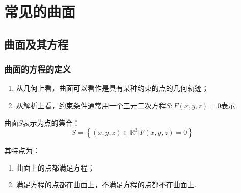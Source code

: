 \chapter{常见的曲面}
\section{曲面及其方程}
\subsection{曲面的方程的定义}
\noindent
\thispagestyle{empty}
\begin{enumerate}[]
	\setlength{\itemindent}{1em}
	\setlength{\topsep}{0.01em}
	\setlength{\itemsep}{0.01em}
	\item 从几何上看，曲面可以看作是具有{\color{dy}某种约束的点的几何轨迹}；
	\item 从解析上看，约束条件通常用一个{\color{dy}三元二次方程$S:F(x,y,z)=0$}表示.
\end{enumerate}
曲面$S$表示为点的集合：
\begin{equation}
S=\left\lbrace (x,y,z)\in \mathbb{R}^3|F(x,y,z)=0\right\rbrace 
\end{equation}
\par 其特点为：
\begin{enumerate}[(1)]
	\setlength{\itemindent}{3em}
	\setlength{\topsep}{0.01em}
	\setlength{\itemsep}{0.01em}
	\item 曲面上的点都满足方程；
	\item 满足方程的点都在曲面上，不满足方程的点都不在曲面上.
\end{enumerate}
